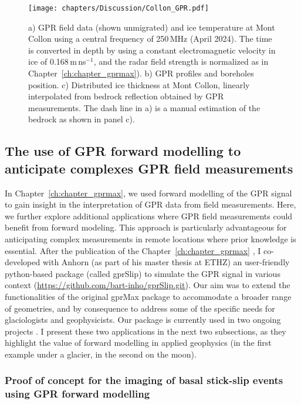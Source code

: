 \begin{figure}[h]
    \centering
    \texttt{[image: chapters/Discussion/Collon\_GPR.pdf]}
    \caption{a) GPR field data (shown unmigrated) and ice temperature at Mont Collon using a central frequency of 250\,MHz (April 2024). The time is converted in depth by using a constant electromagnetic velocity in ice of 0.168\,m\,ns$^{-1}$, and the radar field strength is normalized as in Chapter~\ref{ch:chapter_gprmax}). b) GPR profiles and boreholes position. c) Distributed ice thickness at Mont Collon, linearly interpolated from bedrock reflection obtained by GPR measurements. The dash line in a) is a manual estimation of the bedrock as shown in panel c).}
    \label{fig:collon_GPR}
\end{figure}



\subsection{The use of GPR forward modelling to anticipate complexes GPR field measurements}

In Chapter~\ref{ch:chapter_gprmax}, we used forward modelling of the GPR signal to gain insight in the interpretation of GPR data from field measurements. Here, we further explore additional applications where GPR field measurements could benefit from forward modeling. This approach is particularly advantageous for anticipating complex measurements in remote locations where prior knowledge is essential. After the publication of the Chapter~\ref{ch:chapter_gprmax} \citep{Ogier&al2023}, I co-developed with Anhorn (as part of his master thesis at ETHZ) an user-friendly python-based package (called gprSlip) to simulate the GPR signal in various context (\url{https://github.com/bart-inho/gprSlip.git}). Our aim was to extend the functionalities of the original gprMax package \citep{Warren&al2016} to accommodate a broader range of geometries, and by consequence to address some of the specific needs for glaciologists and geophysicists. Our package is currently used in two ongoing projects \citep{Aichele&al2024,Mittelholz&al2024}. I present these two applications in the next two subsections, as they highlight the value of forward modelling in applied geophysics (in the first example under a glacier, in the second on the moon). 

\subsubsection{Proof of concept for the imaging of basal stick-slip events using GPR forward modelling}
 
